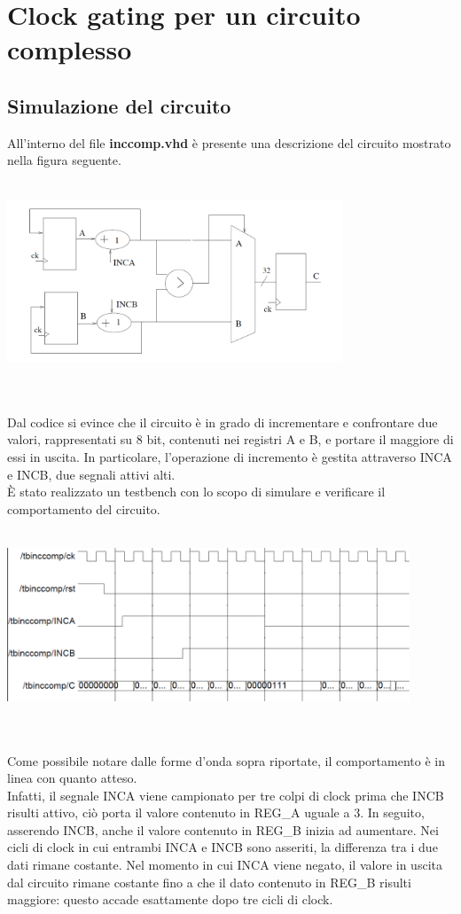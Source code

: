 \documentclass[11pt,  english, makeidx, a4paper, titlepage, oneside]{book}
\begin{document}
\section{Clock gating per un circuito complesso}
\subsection{Simulazione del circuito}
All'interno del file \textbf{inccomp.vhd} è presente una descrizione del circuito mostrato nella figura seguente.
\\\\
\centerline{\includegraphics[width=10cm]{./img/Lab_3/inccomp_no_gating.png}}
\\\\
Dal codice si evince che il circuito è in grado di incrementare e confrontare due valori, rappresentati su 8 bit, contenuti nei registri A e B, e portare il maggiore di essi in uscita. In particolare, l'operazione di incremento è gestita attraverso INCA e INCB, due segnali attivi alti.
\\
È stato realizzato un testbench con lo scopo di simulare e verificare il comportamento del circuito.
\\\\
\centerline{\includegraphics[width=12cm]{./img/Lab_3/inccomp_no_gating_behavior.png}}
\\\\
Come possibile notare dalle forme d'onda sopra riportate, il comportamento è in linea con quanto atteso.
\\ 
Infatti, il segnale INCA viene campionato per tre colpi di clock prima che INCB risulti attivo, ciò porta il valore contenuto in REG\_A uguale a 3. In seguito, asserendo INCB, anche il valore contenuto in REG\_B inizia ad aumentare. Nei cicli di clock in cui entrambi INCA e INCB sono asseriti, la differenza tra i due dati rimane costante. Nel momento in cui INCA viene negato, il valore in uscita dal circuito rimane costante fino a che il dato contenuto in REG\_B risulti maggiore: questo accade esattamente dopo tre cicli di clock.
\end{document}
